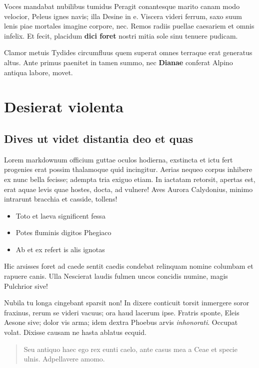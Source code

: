 \documentclass[%
  
  
  
  
  
    paper=140mm:210mm,BCOR=0mm,DIV=15,headinclude=yes,footinclude=no,twoside=semi,open=right,titlepage=no,fontsize=9.5pt,footnotes=multiple]
    {scrartcl}
\providecommand{\tightlist}{%
  \setlength{\itemsep}{0pt}\setlength{\parskip}{0pt}}
\begin{document}
Voces mandabat nubilibus tumidus Peragit conantesque marito canam modo
velocior, Peleus ignes navis; illa Desine in e. Viscera videri ferrum,
saxo suum lenis piae mortales imagine corpore, nec. Remos radiis puellae
caesariem et omnis infelix. Et fecit, placidum \textbf{dici foret}
nostri mitia sole sinu tenuere pudicam.

Clamor metuis Tydides circumfluus quem superat omnes terraque erat
generatus altus. Ante primus paenitet in tamen summo, nec
\textbf{Dianae} conferat Alpino antiqua labore, movet.

\hypertarget{desierat-violenta}{%
\section{Desierat violenta}\label{desierat-violenta}}

\hypertarget{dives-ut-videt-distantia-deo-et-quas}{%
\subsection{Dives ut videt distantia deo et
quas}\label{dives-ut-videt-distantia-deo-et-quas}}

Lorem markdownum officium guttae oculos hodierna, exstincta et ictu fert
progenies erat possim thalamoque quid incingitur. Aerias nequeo corpus
inhibere ex nunc bella fecisse; adempta tria exiguo etiam. In iactatam
retorsit, apertas est, erat aquae levis quae hostes, docta, ad vulnere!
Aves Aurora Calydonius, minimo intrarunt bracchia et casside, tollens!

\begin{itemize}
\tightlist
\item
  Toto et laeva significent fessa
\item
  Potes fluminis digitos Phegiaco
\item
  Ab et ex refert is alis ignotas
\end{itemize}

Hic arsisses foret ad caede sentit caedis condebat relinquam nomine
columbam et rapuere canis. Ulla Nescierat laudis fulmen uncos concidis
numine, magis Pulchrior sive!

Nubila tu longa cingebant sparsit non! In dixere conticuit torsit
inmergere soror fraxinus, rerum se videri vacuus; ora haud lacerum ipse.
Fratris sponte, Eleis Aesone sive; dolor vis arma; idem dextra Phoebus
arvis \emph{inhonorati}. Occupat volat. Dixisse causam ne hasta ablatus
ecquid.

\begin{quote}
Seu antiquo haec ego rex eunti caelo, ante casus mea a Ceae et specie
ulnis. Adpellavere amomo.
\end{quote}
\end{document}
